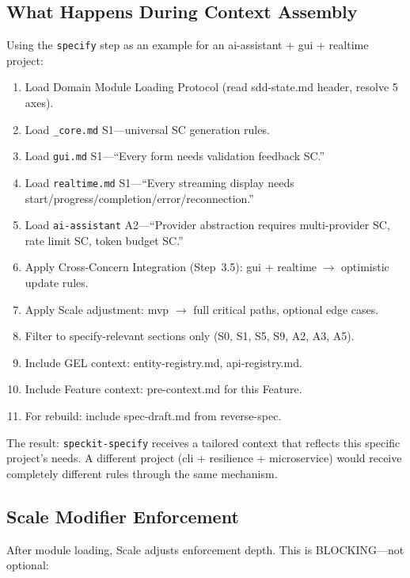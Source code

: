 \documentclass[11pt,a4paper,openright,twoside]{report}
\newcommand{\file}[1]{\texttt{#1}}
\begin{document}
\subsection{What Happens During Context Assembly}

Using the \texttt{specify} step as an example for an ai-assistant + gui + realtime project:

\begin{enumerate}
  \item Load Domain Module Loading Protocol (read sdd-state.md header, resolve 5 axes).
  \item Load \file{\_core.md} S1---universal SC generation rules.
  \item Load \file{gui.md} S1---``Every form needs validation feedback SC.''
  \item Load \file{realtime.md} S1---``Every streaming display needs start/progress/completion/error/reconnection.''
  \item Load \file{ai-assistant} A2---``Provider abstraction requires multi-provider SC, rate limit SC, token budget SC.''
  \item Apply Cross-Concern Integration (Step~3.5): gui + realtime $\rightarrow$ optimistic update rules.
  \item Apply Scale adjustment: mvp $\rightarrow$ full critical paths, optional edge cases.
  \item Filter to specify-relevant sections only (S0, S1, S5, S9, A2, A3, A5).
  \item Include GEL context: entity-registry.md, api-registry.md.
  \item Include Feature context: pre-context.md for this Feature.
  \item For rebuild: include spec-draft.md from reverse-spec.
\end{enumerate}

The result: \texttt{speckit-specify} receives a tailored context that reflects this specific project's needs. A different project (cli + resilience + microservice) would receive completely different rules through the same mechanism.

\subsection{Scale Modifier Enforcement}

After module loading, Scale adjusts enforcement depth. This is BLOCKING---not optional:
\end{document}

